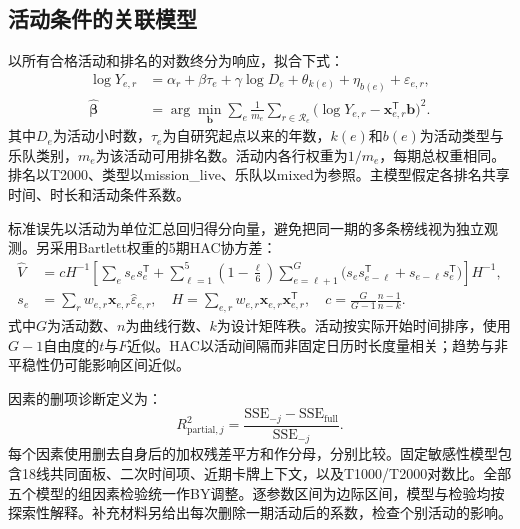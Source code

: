 \documentclass[preprint,12pt]{elsarticle}
\begin{document}
\subsection{活动条件的关联模型}

以所有合格活动和排名的对数终分为响应，拟合下式：
\begin{equation}\label{eq:association}
\begin{aligned}
\log Y_{e,r}&=\alpha_r+\beta\tau_e+\gamma\log D_e+
\theta_{k(e)}+\eta_{b(e)}+\varepsilon_{e,r},\\
\widehat{\symbf\beta}&=\arg\min_{\symbf b}
\sum_e\frac{1}{m_e}\sum_{r\in\mathcal R_e}
\bigl(\log Y_{e,r}-\symbf x_{e,r}^{\mathsf T}\symbf b\bigr)^2.
\end{aligned}
\end{equation}
其中\(D_e\)为活动小时数，\(\tau_e\)为自研究起点以来的年数，\(k(e)\)和\(b(e)\)为活动类型与乐队类别，\(m_e\)为该活动可用排名数。活动内各行权重为\(1/m_e\)，每期总权重相同。排名以T2000、类型以mission\_live、乐队以mixed为参照。主模型假定各排名共享时间、时长和活动条件系数。

标准误先以活动为单位汇总回归得分向量，避免把同一期的多条榜线视为独立观测\citep{cameron2015}。另采用Bartlett权重的5期HAC协方差\citep{newey1987}：
\begin{equation}\label{eq:hac}
\begin{aligned}
\widehat V&=cH^{-1}\!\left[\sum_es_es_e^{\mathsf T}
+\sum_{\ell=1}^{5}\left(1-\frac{\ell}{6}\right)
\sum_{e=\ell+1}^{G}
\bigl(s_es_{e-\ell}^{\mathsf T}+s_{e-\ell}s_e^{\mathsf T}\bigr)\right]H^{-1},\\
s_e&=\sum_rw_{e,r}\symbf x_{e,r}\widehat\varepsilon_{e,r},\quad
H=\sum_{e,r}w_{e,r}\symbf x_{e,r}\symbf x_{e,r}^{\mathsf T},\quad
c=\frac{G}{G-1}\frac{n-1}{n-k}.
\end{aligned}
\end{equation}
式中\(G\)为活动数、\(n\)为曲线行数、\(k\)为设计矩阵秩。活动按实际开始时间排序，使用\(G-1\)自由度的\(t\)与\(F\)近似。HAC以活动间隔而非固定日历时长度量相关；趋势与非平稳性仍可能影响区间近似。

因素的删项诊断定义为：
\begin{equation}\label{eq:partialr}
R^2_{\mathrm{partial},j}=
\frac{\mathrm{SSE}_{-j}-\mathrm{SSE}_{\mathrm{full}}}{\mathrm{SSE}_{-j}}.
\end{equation}
每个因素使用删去自身后的加权残差平方和作分母，分别比较。固定敏感性模型包含18线共同面板、二次时间项、近期卡牌上下文，以及T1000/T2000对数比。全部五个模型的\NumTests{}组因素检验统一作BY调整\citep{benjamini2001}。逐参数区间为边际区间，模型与检验均按探索性解释。补充材料另给出每次删除一期活动后的系数，检查个别活动的影响。
\end{document}
